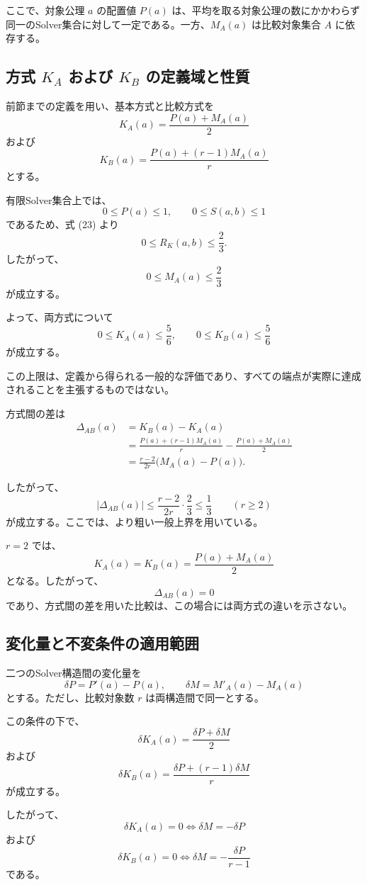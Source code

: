 \documentclass[a4paper,11pt]{ltjsarticle}
\begin{document}
ここで、対象公理 $a$ の配置値 $P(a)$ は、平均を取る対象公理の数にかかわらず
同一のSolver集合に対して一定である。一方、$M_A(a)$ は比較対象集合 $A$ に依存する。

\subsection{方式 $K_A$ および $K_B$ の定義域と性質}

前節までの定義を用い、基本方式と比較方式を
\[
\boxed{
K_A(a)=\frac{P(a)+M_A(a)}{2}
}
\tag{26}
\]
および
\[
\boxed{
K_B(a)=
\frac{P(a)+(r-1)M_A(a)}{r}
}
\tag{27}
\]
とする。

有限Solver集合上では、
\[
0\leq P(a)\leq 1,\qquad
0\leq S(a,b)\leq 1
\]
であるため、式 (23) より
\[
0\leq R_K(a,b)\leq\frac23.
\]
したがって、
\[
0\leq M_A(a)\leq\frac23
\]
が成立する。

よって、両方式について
\[
0\leq K_A(a)\leq\frac56,
\qquad
0\leq K_B(a)\leq\frac56
\]
が成立する。

この上限は、定義から得られる一般的な評価であり、すべての端点が実際に達成されることを主張するものではない。

方式間の差は
\[
\begin{aligned}
\Delta_{AB}(a)
&=K_B(a)-K_A(a)\\
&=\frac{P(a)+(r-1)M_A(a)}{r}
-\frac{P(a)+M_A(a)}{2}\\
&=\boxed{
\frac{r-2}{2r}\bigl(M_A(a)-P(a)\bigr)
}.
\end{aligned}
\tag{28}
\]

したがって、
\[
|\Delta_{AB}(a)|
\leq \frac{r-2}{2r}\cdot\frac23
\leq\frac13
\qquad (r\geq 2)
\]
が成立する。ここでは、より粗い一般上界を用いている。

$r=2$ では、
\[
K_A(a)=K_B(a)=\frac{P(a)+M_A(a)}{2}
\]
となる。したがって、
\[
\Delta_{AB}(a)=0
\]
であり、方式間の差を用いた比較は、この場合には両方式の違いを示さない。

\subsection{変化量と不変条件の適用範囲}

二つのSolver構造間の変化量を
\[
\delta P=P'(a)-P(a),\qquad
\delta M=M'_A(a)-M_A(a)
\]
とする。ただし、比較対象数 $r$ は両構造間で同一とする。

この条件の下で、
\[
\delta K_A(a)=\frac{\delta P+\delta M}{2}
\]
および
\[
\delta K_B(a)=
\frac{\delta P+(r-1)\delta M}{r}
\]
が成立する。

したがって、
\[
\delta K_A(a)=0
\iff
\delta M=-\delta P
\tag{29}
\]
および
\[
\delta K_B(a)=0
\iff
\delta M=-\frac{\delta P}{r-1}
\tag{30}
\]
である。
\end{document}
